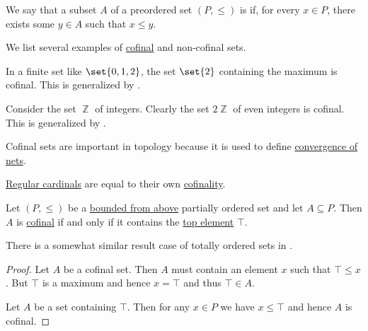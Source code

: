 \begin{definition}\label{def:cofinal_set}
  We say that a subset \( A \) of a preordered set \( (P, \leq) \) is  if, for every \( x \in P \), there exists some \( y \in A \) such that \( x \leq y \).
\end{definition}

\begin{example}\label{ex:def:cofinal_set}
  We list several examples of \hyperref[def:cofinal_set]{cofinal} and non-cofinal sets.

  \begin{itemize}
     In a finite set like \( \set{ 0, 1, 2 } \), the set \( \set{ 2 } \) containing the maximum is cofinal. This is generalized by .

     Consider the set \( \BbbZ \) of integers. Clearly the set \( 2\BbbZ \) of even integers is cofinal. This is generalized by .

     Cofinal sets are important in topology because it is used to define \hyperref[def:net_convergence]{convergence of nets}.

     \hyperref[def:regular_cardinal]{Regular cardinals} are equal to their own \hyperref[def:cofinality]{cofinality}.
  \end{itemize}
\end{example}

\begin{proposition}\label{thm:partially_ordered_cofinal_equivalences}
  Let \( (P, \leq) \) be a \hyperref[def:extremal_points/upper_and_lower_bounds]{bounded from above} partially ordered set and let \( A \subseteq P \). Then \( A \) is \hyperref[def:cofinal_set]{cofinal} if and only if it contains the \hyperref[def:extremal_points/top_and_bottom]{top element} \( \top \).
\end{proposition}
\begin{comments}
  \item There is a somewhat similar result case of totally ordered sets in .
\end{comments}
\begin{proof}
  \SufficiencySubProof Let \( A \) be a cofinal set. Then \( A \) must contain an element \( x \) such that \( \top \leq x \). But \( \top \) is a maximum and hence \( x = \top \) and thus \( \top \in A \).

  \NecessitySubProof Let \( A \) be a set containing \( \top \). Then for any \( x \in P \) we have \( x \leq \top \) and hence \( A \) is cofinal.
\end{proof}

